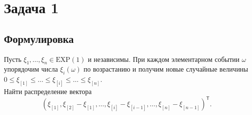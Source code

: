 \documentclass[specialist,
substylefile = spbu_report.rtx,
subf,href,colorlinks=true, 12pt]{disser}
\begin{document}
	
	
	
	\author{Яковлев Денис Михайлович\\
		Группа 21.Б04-мм\\
		\textsc{095998@student.spbu.ru}}
	
	\date{\today}
	
	\maketitle
	\newpage
	\thispagestyle{empty}
	\tableofcontents
	\newpage
	\section{Задача 1}
	\subsection{Формулировка}
	Пусть $\xi_1,\dots,\xi_n\in \mathrm{EXP}(1)$ и независимы. При каждом элементарном событии $\omega$ упорядочим числа $\xi_i(\omega)$ по возрастанию и получим новые случайные величины $0\leqslant\xi_{[1]}\leqslant\dots\leqslant\xi_{[i]}\leqslant\dots\leqslant\xi_{[n]}$.\\
	Найти распределение вектора
	\begin{equation*}
		(\xi_{[1]},\xi_{[2]}-\xi_{[1]},\dots,\xi_{[i]}-\xi_{[i-1]},\dots,\xi_{[n]}-\xi_{[n-1]})^\mathsf{T}.
	\end{equation*}
\end{document}
